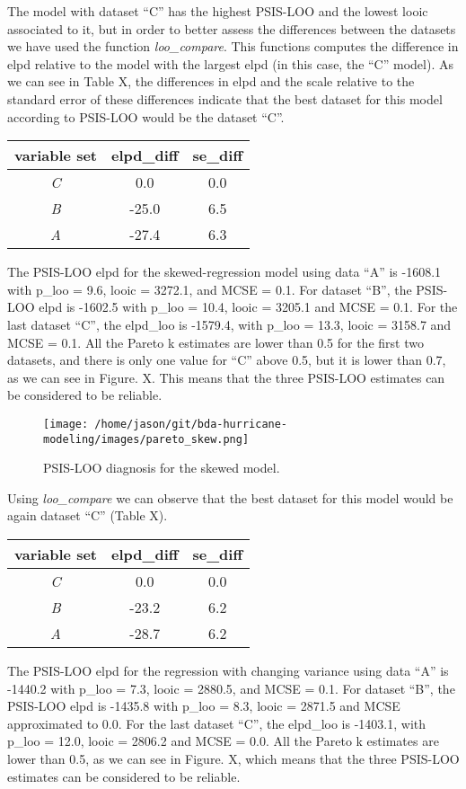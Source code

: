 \documentclass[
]{article}
\begin{document}
The model with dataset ``C'' has the highest PSIS-LOO and the lowest
looic associated to it, but in order to better assess the differences
between the datasets we have used the function \emph{loo\_compare}. This
functions computes the difference in elpd relative to the model with the
largest elpd (in this case, the ``C'' model). As we can see in Table X,
the differences in elpd and the scale relative to the standard error of
these differences indicate that the best dataset for this model
according to PSIS-LOO would be the dataset ``C''.

\begin{longtable}[]{@{}ccc@{}}
\toprule
variable set & \textbf{elpd\_diff} & \textbf{se\_diff}\tabularnewline
\midrule
\endhead
\emph{C} & 0.0 & 0.0\tabularnewline
\emph{B} & -25.0 & 6.5\tabularnewline
\emph{A} & -27.4 & 6.3\tabularnewline
\bottomrule
\end{longtable}

The PSIS-LOO elpd for the skewed-regression model using data ``A'' is
-1608.1 with p\_loo = 9.6, looic = 3272.1, and MCSE = 0.1. For dataset
``B'', the PSIS-LOO elpd is -1602.5 with p\_loo = 10.4, looic = 3205.1
and MCSE = 0.1. For the last dataset ``C'', the elpd\_loo is -1579.4,
with p\_loo = 13.3, looic = 3158.7 and MCSE = 0.1. All the Pareto k
estimates are lower than 0.5 for the first two datasets, and there is
only one value for ``C'' above 0.5, but it is lower than 0.7, as we can
see in Figure. X. This means that the three PSIS-LOO estimates can be
considered to be reliable.

\begin{figure}
\centering
\texttt{[image: /home/jason/git/bda-hurricane-modeling/images/pareto\_skew.png]}
\caption{PSIS-LOO diagnosis for the skewed model.}
\end{figure}

\newpage

Using \emph{loo\_compare} we can observe that the best dataset for this
model would be again dataset ``C'' (Table X).

\begin{longtable}[]{@{}ccc@{}}
\toprule
variable set & \textbf{elpd\_diff} & \textbf{se\_diff}\tabularnewline
\midrule
\endhead
\emph{C} & 0.0 & 0.0\tabularnewline
\emph{B} & -23.2 & 6.2\tabularnewline
\emph{A} & -28.7 & 6.2\tabularnewline
\bottomrule
\end{longtable}

The PSIS-LOO elpd for the regression with changing variance using data
``A'' is -1440.2 with p\_loo = 7.3, looic = 2880.5, and MCSE = 0.1. For
dataset ``B'', the PSIS-LOO elpd is -1435.8 with p\_loo = 8.3, looic =
2871.5 and MCSE approximated to 0.0. For the last dataset ``C'', the
elpd\_loo is -1403.1, with p\_loo = 12.0, looic = 2806.2 and MCSE = 0.0.
All the Pareto k estimates are lower than 0.5, as we can see in Figure.
X, which means that the three PSIS-LOO estimates can be considered to be
reliable.
\end{document}
